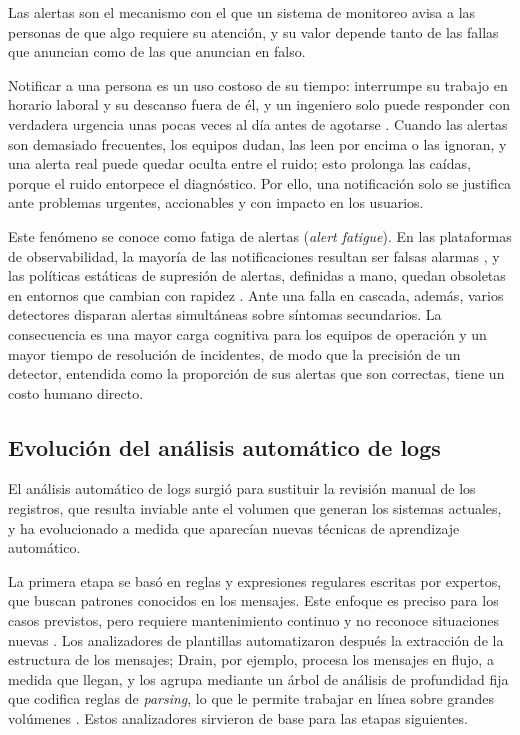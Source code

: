 Las alertas son el mecanismo con el que un sistema de monitoreo avisa a las personas de que algo requiere su atención, y su valor depende tanto de las fallas que anuncian como de las que anuncian en falso.

Notificar a una persona es un uso costoso de su tiempo: interrumpe su trabajo en horario laboral y su descanso fuera de él, y un ingeniero solo puede responder con verdadera urgencia unas pocas veces al día antes de agotarse \cite{ewaschuk2016_sre_monitoring}. Cuando las alertas son demasiado frecuentes, los equipos dudan, las leen por encima o las ignoran, y una alerta real puede quedar oculta entre el ruido; esto prolonga las caídas, porque el ruido entorpece el diagnóstico. Por ello, una notificación solo se justifica ante problemas urgentes, accionables y con impacto en los usuarios.

Este fenómeno se conoce como fatiga de alertas (\textit{alert fatigue}). En las plataformas de observabilidad, la mayoría de las notificaciones resultan ser falsas alarmas \cite{allam2023_aiops}, y las políticas estáticas de supresión de alertas, definidas a mano, quedan obsoletas en entornos que cambian con rapidez \cite{bhukar2024_alertsuppression}. Ante una falla en cascada, además, varios detectores disparan alertas simultáneas sobre síntomas secundarios. La consecuencia es una mayor carga cognitiva para los equipos de operación y un mayor tiempo de resolución de incidentes, de modo que la precisión de un detector, entendida como la proporción de sus alertas que son correctas, tiene un costo humano directo.

\subsection{Evolución del análisis automático de logs}\label{sec:ant_evolucion_logs}

El análisis automático de logs surgió para sustituir la revisión manual de los registros, que resulta inviable ante el volumen que generan los sistemas actuales, y ha evolucionado a medida que aparecían nuevas técnicas de aprendizaje automático.

La primera etapa se basó en reglas y expresiones regulares escritas por expertos, que buscan patrones conocidos en los mensajes. Este enfoque es preciso para los casos previstos, pero requiere mantenimiento continuo y no reconoce situaciones nuevas \cite{he2021_survey}. Los analizadores de plantillas automatizaron después la extracción de la estructura de los mensajes; Drain, por ejemplo, procesa los mensajes en flujo, a medida que llegan, y los agrupa mediante un árbol de análisis de profundidad fija que codifica reglas de \textit{parsing}, lo que le permite trabajar en línea sobre grandes volúmenes \cite{he2017_drain}. Estos analizadores sirvieron de base para las etapas siguientes.

